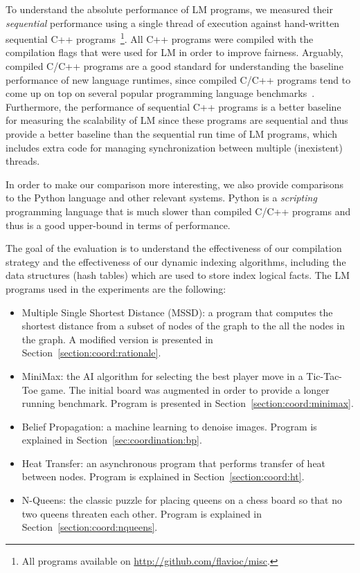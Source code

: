 To understand the absolute performance of LM programs, we measured their
\emph{sequential} performance using a single thread of execution against
hand-written sequential C++ programs~\footnote{All programs available on
\url{http://github.com/flavioc/misc}.}. All C++ programs were compiled with the
compilation flags that were used for LM in order to improve fairness. Arguably,
compiled C/C++ programs are a good standard for understanding the baseline
performance of new language runtimes, since compiled C/C++ programs tend to come
up on top on several popular programming language
benchmarks~\cite{language_benchmarks}.  Furthermore, the performance of
sequential C++ programs is a better baseline for measuring the scalability of LM
since these programs are sequential and thus provide a better baseline than the
sequential run time of LM programs, which includes extra code for managing
synchronization between multiple (inexistent) threads.

In order to make our comparison more interesting, we also provide comparisons to
the Python language and other relevant systems. Python is a \emph{scripting}
programming language that is much slower than compiled C/C++ programs and thus
is a good upper-bound in terms of performance.

The goal of the evaluation is to understand the effectiveness of our compilation
strategy and the effectiveness of our dynamic indexing algorithms, including the
data structures (hash tables) which are used to store index logical facts. The
LM programs used in the experiments are the following:

\begin{itemize}
   \item Multiple Single Shortest Distance (MSSD): a program that computes the
      shortest distance from a subset of nodes of the graph to the all the nodes
      in the graph. A modified version is presented in
      Section~\ref{section:coord:rationale}.

      
    \item MiniMax: the AI algorithm for selecting the best player move in a
       Tic-Tac-Toe game. The initial board was augmented in order to provide a
       longer running benchmark. Program is presented in
       Section~\ref{section:coord:minimax}.

   \item Belief Propagation: a machine learning to denoise images. Program is
      explained in Section~\ref{sec:coordination:bp}.

    \item Heat Transfer: an asynchronous program that performs transfer of heat
       between nodes. Program is explained in Section~\ref{section:coord:ht}.

   \item N-Queens: the classic puzzle for placing queens on a chess board so
      that no two queens threaten each other. Program is explained in
      Section~\ref{section:coord:nqueens}.

\end{itemize}

